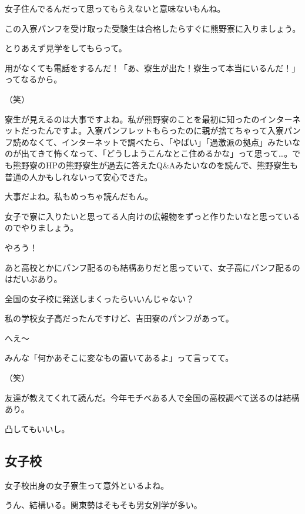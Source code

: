 \begin{multicols}{2}
  女子住んでるんだって思ってもらえないと意味ないもんね。

  この入寮パンフを受け取った受験生は合格したらすぐに熊野寮に入りましょう。

  とりあえず見学をしてもらって。

  用がなくても電話をするんだ！「あ、寮生が出た！寮生って本当にいるんだ！」ってなるから。

  （笑）

  寮生が見えるのは大事ですよね。私が熊野寮のことを最初に知ったのインターネットだったんですよ。入寮パンフレットもらったのに親が捨てちゃって入寮パンフ読めなくて、インターネットで調べたら、「やばい」「過激派の拠点」みたいなのが出てきて怖くなって、「どうしようこんなとこ住めるかな」って思って…。でも熊野寮のHPの熊野寮生が過去に答えたQ\&Aみたいなのを読んで、熊野寮生も普通の人かもしれないって安心できた。

  大事だよね。私もめっちゃ読んだもん。

  女子で寮に入りたいと思ってる人向けの広報物をずっと作りたいなと思っているのでやりましょう。

  やろう！

  あと高校とかにパンフ配るのも結構ありだと思っていて、女子高にパンフ配るのはだいぶあり。

  全国の女子校に発送しまくったらいいんじゃない？

  私の学校女子高だったんですけど、吉田寮のパンフがあって。

  へえ～

  みんな「何かあそこに変なもの置いてあるよ」って言ってて。

  （笑）

  友達が教えてくれて読んだ。今年モチベある人で全国の高校調べて送るのは結構あり。

  凸してもいいし。







  \subsection{女子校}



  女子校出身の女子寮生って意外といるよね。

  うん、結構いる。関東勢はそもそも男女別学が多い。


\end{multicols}
